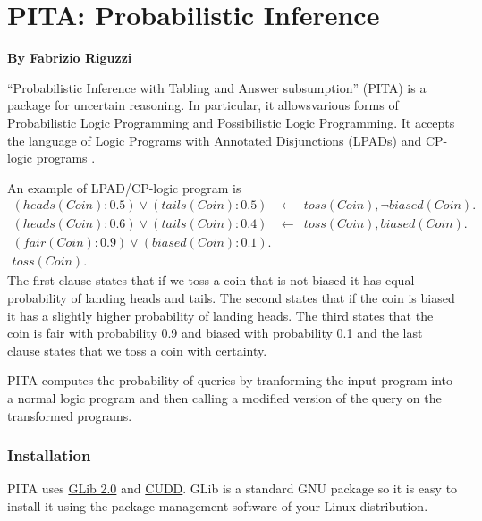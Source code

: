 \chapter{ PITA: Probabilistic  Inference}
\label{package:pita} 

  \begin{center}
    {\Large {\bf By Fabrizio Riguzzi}}
  \end{center}


%



``Probabilistic  Inference with Tabling and Answer subsumption'' (PITA) \cite{RigSwi10-ICLP10-IC} is a package for uncertain reasoning. In particular, it allowsvarious forms of Probabilistic Logic Programming and Possibilistic Logic Programming. It accepts the language of Logic Programs with Annotated Disjunctions (LPADs)\cite{VenVer03-TR,VenVer04-ICLP04-IC} and CP-logic programs \cite{VenDenBru-JELIA06,DBLP:journals/tplp/VennekensDB09}.

An example of LPAD/CP-logic program is 
\begin{eqnarray*}
(heads(Coin):0.5)\vee (tails(Coin):0.5)&\leftarrow&
toss(Coin),\neg biased(Coin).\\
(heads(Coin):0.6)\vee (tails(Coin):0.4)&\leftarrow&
toss(Coin), biased(Coin).\\
(fair(Coin):0.9) \vee (biased(Coin):0.1).&&\\
toss(Coin).&&
\end{eqnarray*}
The first clause states that if we toss a coin that is not biased it has equal probability of landing heads and tails. The second states that if the coin is biased it has a slightly higher probability of landing heads. The third states that the coin is fair with probability 0.9 and biased with probability 0.1 and the last clause states that we toss a coin with certainty.

PITA computes the probability of queries by tranforming the input program into a normal logic program and then calling a modified version of the query on the transformed programs.

\subsection{Installation}
PITA uses \href{http://www.gtk.org/}{GLib 2.0} and  \href{http://vlsi.colorado.edu/~fabio/CUDD/}{CUDD}.
GLib is a standard GNU package 
so it is easy to install it using the package management software of your Linux 
distribution.

